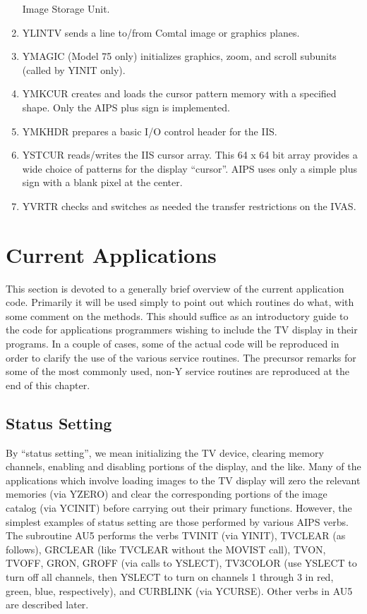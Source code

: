 \begin{enumerate}
Image Storage Unit.
\item YLINTV sends a line to/from Comtal image or graphics
planes.
\item YMAGIC (Model 75 only) initializes graphics, zoom, and
scroll subunits (called by YINIT only).
\item YMKCUR creates and loads the cursor pattern memory with
a specified shape.  Only the AIPS plus sign is implemented.
\item YMKHDR prepares a basic I/O control header for the IIS.
\item YSTCUR reads/writes the IIS cursor array.  This 64 x 64
bit array provides a wide choice of patterns for the display ``cursor''.
AIPS uses only a simple plus sign with a blank pixel at the center.
\item YVRTR checks and switches as needed the transfer
restrictions on the IVAS.
\end{enumerate} %

\section{Current Applications}
This section is devoted to a generally brief overview of the current
application code.  Primarily it will be used simply to point out which
routines do what, with some comment on the methods. This should
suffice as an introductory guide to the code for applications
programmers wishing to include the TV display in their programs.  In a
couple of cases, some of the actual code will be reproduced in order
to clarify the use of the various service routines.  The precursor
remarks for some of the most commonly used, non-Y service routines are
reproduced at the end of this chapter.

\subsection{Status Setting}
By ``status setting'', we mean initializing the TV device, clearing
memory channels, enabling and disabling portions of the display, and
the like.  Many of the applications which involve loading images to
the TV display will zero the relevant memories (via YZERO) and clear
the corresponding portions of the image catalog (via YCINIT) before
carrying out their primary functions.  However, the simplest examples
of status setting are those performed by various AIPS verbs.  The
subroutine AU5 performs the verbs TVINIT (via YINIT), TVCLEAR (as
follows), GRCLEAR (like TVCLEAR without the MOVIST call), TVON, TVOFF,
GRON, GROFF (via calls to YSLECT), TV3COLOR (use YSLECT to turn off
all channels, then YSLECT to turn on channels 1 through 3 in red,
green, blue, respectively), and CURBLINK (via YCURSE).  Other verbs in
AU5 are described later.

